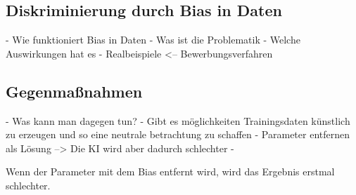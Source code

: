 \begin{onehalfspace}
    \subsection{Diskriminierung durch Bias in Daten}
    \label{subsubsec:diskriminierungdurchverzerrung}

        - Wie funktioniert Bias in Daten
        - Was ist die Problematik
        - Welche Auswirkungen hat es 
        - Realbeispiele <-- Bewerbungsverfahren
        \cite{IncidentDatabase2015} \cite{hagendorff2019maschinelles}

    \subsection{Gegenma{\ss}nahmen}
    \label{subsubsec:gegenmassnahmen}
        - Was kann man dagegen tun?
        - Gibt es möglichkeiten Trainingsdaten künstlich zu erzeugen und so eine neutrale betrachtung zu schaffen
        - Parameter entfernen als Lösung --> Die KI wird aber dadurch schlechter 
        - 

        Wenn der Parameter mit dem Bias entfernt wird, wird das Ergebnis erstmal schlechter. 
        
    \newpage
\end{onehalfspace}